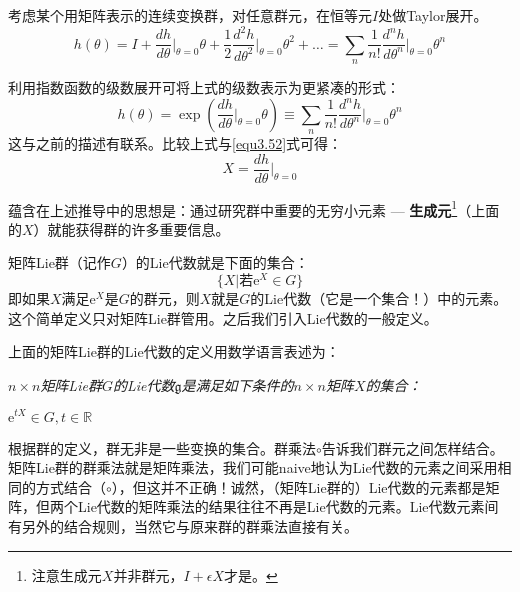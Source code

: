 考虑某个用矩阵表示的连续变换群，对任意群元，在恒等元$I$处做Taylor展开。
\begin{equation}
\label{equ3.53}
h(\theta) = I + \frac{dh}{d\theta} \Bigg|_{\theta = 0} \theta + \frac{1}{2} \frac{d^2 h}{d \theta^2} \Bigg|_{\theta = 0} \theta^2 + \dots = \sum_n \frac{1}{n!} \frac{d^n h}{d \theta^n} \Bigg|_{\theta = 0} \theta^n
\end{equation}

利用指数函数的级数展开可将上式的级数表示为更紧凑的形式：
\begin{equation}
\label{equ3.54}
h(\theta) = \exp \left( \frac{dh}{d\theta}\Big|_{\theta = 0} \theta \right) \equiv \sum_n \frac{1}{n!} \frac{d^n h}{d \theta^n}\Bigg|_{\theta = 0} \theta^n
\end{equation}
这与之前的描述有联系。比较上式与\ref{equ3.52}式可得：
\begin{equation}
\label{equ3.55}
X = \frac{dh}{d\theta}\Bigg|_{\theta = 0}
\end{equation}

蕴含在上述推导中的思想是：通过研究群中重要的无穷小元素 --- {\bf 生成元}\footnote{注意生成元$X$并非群元，$I + \epsilon X$才是。}（上面的$X$）就能获得群的许多重要信息。

矩阵Lie群（记作$G$）的Lie代数就是下面的集合：
\[
\Big\{X \Big| \text{若}\mathrm{e}^X \in G \Big\}
\]
即如果$X$满足$\mathrm{e}^X$是$G$的群元，则$X$就是$G$的Lie代数（它是一个集合！）中的元素。这个简单定义只对矩阵Lie群管用。之后我们引入Lie代数的一般定义。

上面的矩阵Lie群的Lie代数的定义用数学语言表述为：

{ \it
$n \times n$矩阵Lie群$G$的Lie代数$\mathfrak{g}$是满足如下条件的$n \times n$矩阵$X$的集合：

	{\begin{center}
		$\mathrm{e}^{tX} \in G, t \in \mathbb{R}$
	\end{center}
	}
}

根据群的定义，群无非是一些变换的集合。群乘法$\circ$告诉我们群元之间怎样结合。矩阵Lie群的群乘法就是矩阵乘法，我们可能naive地认为Lie代数的元素之间采用相同的方式结合（$\circ$），但这并不正确！诚然，（矩阵Lie群的）Lie代数的元素都是矩阵，但两个Lie代数的矩阵乘法的结果往往不再是Lie代数的元素。Lie代数元素间有另外的结合规则，当然它与原来群的群乘法直接有关。

